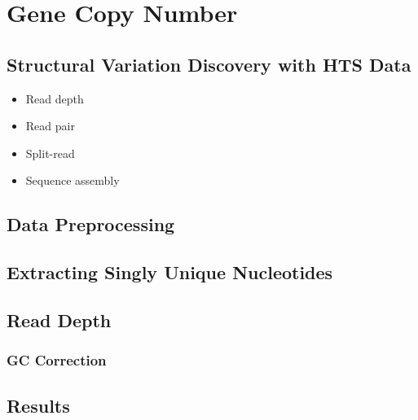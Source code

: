 \chapter{Gene Copy Number}
\section{Structural Variation Discovery with HTS Data}
\begin{itemize}
  \item Read depth
  \item Read pair
  \item Split-read
  \item Sequence assembly
\end{itemize}
\section{Data Preprocessing}
\section{Extracting Singly Unique Nucleotides}
\section{Read Depth}
\subsection{GC Correction}
\section{Results}
